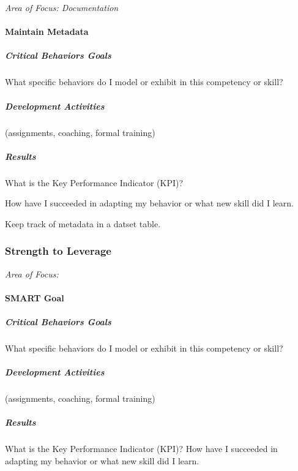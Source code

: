 \textit{Area of Focus: Documentation}
\paragraph{Maintain Metadata}


\subparagraph{Critical Behaviors Goals}

What specific behaviors do I model or exhibit in this competency or skill?
\vspace{.3in}

\subparagraph{Development Activities}

(assignments, coaching, formal training)
\vspace{.3in}

\subparagraph{Results}

What is the Key Performance Indicator (KPI)?

\noindent How have I succeeded in adapting my behavior or what new skill did I learn.

\noindent Keep track of metadata in a datset table.

\clearpage










\subsubsection*{Strength to Leverage}
\textit{Area of Focus:}
\paragraph{SMART Goal}


\subparagraph{Critical Behaviors Goals}

What specific behaviors do I model or exhibit in this competency or skill?
\vspace{.3in}

\subparagraph{Development Activities}

(assignments, coaching, formal training)
\vspace{.3in}

\subparagraph{Results}

What is the Key Performance Indicator (KPI)? How have I succeeded in adapting my behavior or what new skill did I learn.
\clearpage







